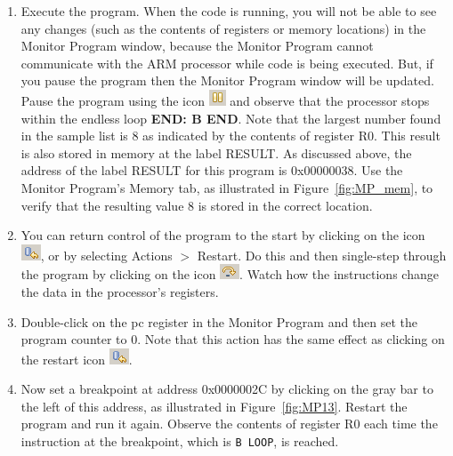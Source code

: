 \documentclass[epsfig,10pt,fullpage]{article}
\begin{document}
\begin{enumerate}
\item Execute the program. When the code is running, you will not be able to see any changes
(such as the contents of registers or memory locations) in the Monitor Program window,
because the Monitor Program cannot communicate with the ARM processor while code is being
executed.  But, if you pause the program then the Monitor Program window will be updated.
Pause the program using the icon \hbox{\includegraphics[scale=0.8]{figures/icon_pause.png}}
and observe that the processor stops within the endless loop {\bf END: B END}.
Note that the largest number found in the sample list is 8 as indicated
by the contents of register R0. This result is also stored in memory at the label
RESULT.  As discussed above, the address of the label RESULT for this program is {\sf 0x00000038}.
Use the Monitor Program's Memory tab, as illustrated in Figure~\ref{fig:MP_mem},
to verify that the resulting value 8 is stored in the correct location.

\item You can return control of the program to the start by clicking 
		  on the icon \hbox{\includegraphics[scale=0.8]{figures/icon_restart.png}}, or by
		  selecting {\sf Actions} $>$ {\sf Restart}. 
Do this and then single-step through the program by clicking on the icon
\hbox{\includegraphics[scale=0.8]{figures/icon_step.png}}. Watch how the instructions change the 
data in the processor's registers.

\item Double-click on the {\sf pc} register in the Monitor Program and then set the program
counter to 0. Note that this action has the same effect as
clicking on the restart icon \hbox{\includegraphics[scale=0.8]{figures/icon_restart.png}}. 

\item Now set a breakpoint at address {\sf 0x0000002C} by clicking on the gray bar to
the left of this address, as illustrated in Figure~\ref{fig:MP13}. Restart the program and run 
it again.  Observe the contents of register R0 each time the instruction at the
breakpoint, which is \texttt{B LOOP}, is reached.


\end{enumerate}
\end{document}
